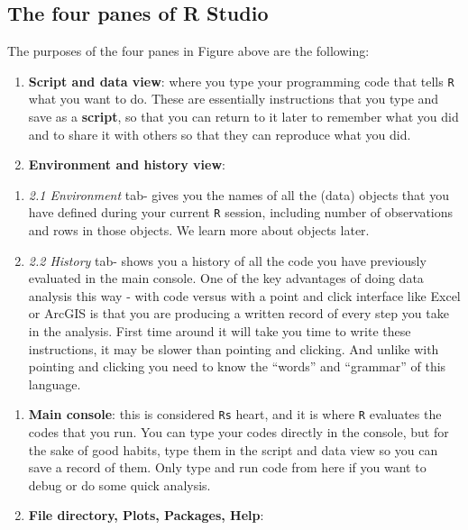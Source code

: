 \documentclass[
]{book}
\begin{document}
\hypertarget{the-four-panes-of-r-studio}{%
\subsection{The four panes of R Studio}\label{the-four-panes-of-r-studio}}

The purposes of the four panes in Figure above are the following:

\begin{enumerate}
\def\labelenumi{\arabic{enumi}.}
\item
  \textbf{Script and data view}: where you type your programming code that tells \texttt{R} what you want to do. These are essentially instructions that you type and save as a \textbf{script}, so that you can return to it later to remember what you did and to share it with others so that they can reproduce what you did.
\item
  \textbf{Environment and history view}:
\end{enumerate}

\begin{enumerate}
\def\labelenumi{\roman{enumi})}
\item
  \emph{2.1 Environment} tab- gives you the names of all the (data) objects that you have defined during your current \texttt{R} session, including number of observations and rows in those objects. We learn more about objects later.
\item
  \emph{2.2 History} tab- shows you a history of all the code you have previously evaluated in the main console. One of the key advantages of doing data analysis this way - with code versus with a point and click interface like Excel or ArcGIS is that you are producing a written record of every step you take in the analysis. First time around it will take you time to write these instructions, it may be slower than pointing and clicking. And unlike with pointing and clicking you need to know the ``words'' and ``grammar'' of this language.
\end{enumerate}

\begin{enumerate}
\def\labelenumi{\arabic{enumi}.}
\setcounter{enumi}{2}
\item
  \textbf{Main console}: this is considered \texttt{R\textquotesingle{}s} heart, and it is where \texttt{R} evaluates the codes that you run. You can type your codes directly in the console, but for the sake of good habits, type them in the script and data view so you can save a record of them. Only type and run code from here if you want to debug or do some quick analysis.
\item
  \textbf{File directory, Plots, Packages, Help}:
\end{enumerate}
\end{document}

